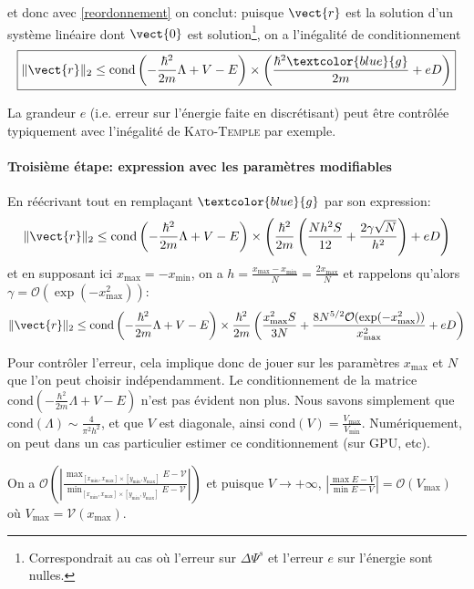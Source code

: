 
et donc avec \ref{reordonnement} on conclut: puisque $\vect{r}$ est la solution d'un système linéaire dont $\vect{0}$ est solution\footnote{Correspondrait au cas où l'erreur sur $\Delta \Psi^s$ et l'erreur $e$ sur l'énergie sont nulles.}, on a l'inégalité de conditionnement
\begin{equation}
    \boxed{\|\vect{r}\|_2 \le \text{cond} \left(-\frac{\hbar^2}{2m}\Lambda +V - E \right)   \times \left( \frac{\hbar^2\textcolor{blue}{g}}{2m} + eD \right)}
\end{equation}

La grandeur $e$ (i.e. erreur sur l'énergie faite en discrétisant) peut être contrôlée typiquement avec l'inégalité de \textsc{Kato-Temple} par exemple.


\paragraph{Troisième étape: expression avec les paramètres modifiables}
En réécrivant tout en remplaçant $\textcolor{blue}{g}$ par son expression:
\begin{equation}
    \|\vect{r}\|_2 \le \text{cond} \left(-\frac{\hbar^2}{2m}\Lambda +V - E \right)   \times \left( \frac{\hbar^2}{2m}\left( \frac{Nh^2S}{12} + \frac{2\gamma\sqrt{N} }{h^2}  \right) + eD \right)
\end{equation}
et en supposant ici $x_\text{max} = -x_\text{min}$, on a $h = \frac{x_\text{max}-x_\text{min}}{N} = \frac{2x_\text{max}}{N}$ et rappelons qu'alors $\gamma = \mathcal{O}(\exp(-x_\text{max}^2))$:
\begin{equation}
    \|\vect{r}\|_2 \le \text{cond} \left(-\frac{\hbar^2}{2m}\Lambda +V - E \right)   \times \frac{\hbar^2}{2m} \left( \frac{x_\text{max}^2 S}{3N} + \frac{8N^{5/2} \mathcal{O}(\exp(-x_\text{max}^2))}{x_\text{max}^2} + eD \right)
\end{equation}


Pour contrôler l'erreur, cela implique donc de jouer sur les paramètres $x_\text{max}$ et $N$ que l'on peut choisir indépendamment. Le conditionnement de la matrice $\text{cond} \left(-\frac{\hbar^2}{2m}\Lambda +V - E \right)$ n'est pas évident non plus. Nous savons simplement que $\text{cond} \left(\Lambda \right) \sim   \frac{4}{\pi^2h^2}$, et que $V$ est diagonale, ainsi $\text{cond}(V) = \frac{V_\text{max}}{V_\text{min}}$. Numériquement, on peut dans un cas particulier estimer ce conditionnement (sur GPU, etc).

On a $\mathcal{O}\left( \left| \frac{\max_{[x_\text{min},x_\text{max}] \times [y_\text{min},y_\text{max}]} E-\mathcal{V}}{\min_{[x_\text{min},x_\text{max}] \times [y_\text{min},y_\text{max}]} E-\mathcal{V}}\right|\right)$ 
et puisque $V \rightarrow +\infty$, $ \left| \frac{\max E-V}{\min E-V}\right|  = \mathcal{O}(V_\text{max})$ où $V_\text{max} = \mathcal{V}(x_\text{max})$.


